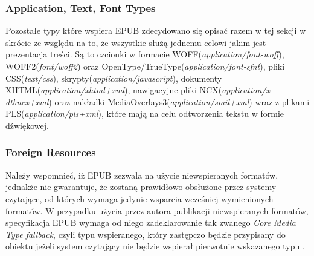 \subsubsection*{Application, Text, Font Types}

Pozostałe typy które wspiera EPUB zdecydowano się opisać razem w tej sekcji w skrócie ze względu na to, że wszystkie służą jednemu celowi jakim jest prezentacja treści. Są to czcionki w formacie WOFF(\textit{application/font-woff}), WOFF2(\textit{font/woff2}) oraz OpenType/TrueType(\textit{application/font-sfnt}), pliki CSS(\textit{text/css}), skrypty(\textit{application/javascript}), dokumenty XHTML(\textit{application/xhtml+xml}), nawigacyjne pliki NCX(\textit{application/x-dtbncx+xml}) oraz nakładki MediaOverlays3(\textit{application/smil+xml}) wraz z plikami PLS(\textit{application/pls+xml}), które mają na celu odtworzenia tekstu w formie dźwiękowej\cite{EPUBCoreMediaTypes}.

\subsubsection*{Foreign Resources}

Należy wspomnieć, iż EPUB zezwala na użycie niewspieranych formatów, jednakże nie gwarantuje, że zostaną prawidłowo obsłużone przez systemy czytające, od których wymaga jedynie wsparcia wcześniej wymienionych formatów. W przypadku użycia przez autora publikacji niewspieranych formatów, specyfikacja EPUB wymaga od niego zadeklarowanie tak zwanego \textit{Core Media Type fallback}, czyli typu wspieranego, który zastępczo będzie przypisany do obiektu jeżeli system czytający nie będzie wspierał pierwotnie wskazanego typu \cite{EPUBSpecificationForeignResources}.
